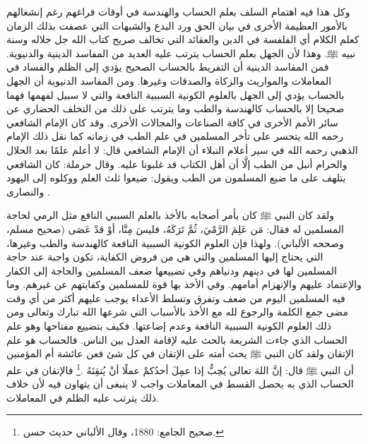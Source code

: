 وكل هذا فيه اهتمام السلف بعلم الحساب والهندسة في أوقات فراغهم رغم إنشغالهم بالأمور العظيمة الأخرى في بيان الحق ورد البدع والشبهات التي عصفت بذلك الزمان كعلم الكلام أي الفلفسة في الدين والعقائد التي تخالف صريح كتاب الله جل جلاله وسنة نبيه ﷺ. وهذا لأن الجهل بعلم الحساب يترتب عليه العديد من المفاسد الدينية والدنيوية. فمن المفاسد الدينية أن التفريط بالحساب الصحيح يؤدي إلى الظلم والفساد في المعاملات والمواريث والزكاة والصدقات وغيرها. ومن المفاسد الدنيوية أن الجهل بالحساب يؤدي إلى الجهل بالعلوم الكونية السببية النافعة والتي لا سبيل لفهمها فهما صحيحا إلا بالحساب كالهندسة والطب وما يترتب على ذلك من التخلف الحضاري عن سائر الأمم الأخرى في كافة الصناعات والمجالات الأخرى. وقد كان الإمام الشافعي رحمه الله يتحسر على تأخر المسلمين في علم الطب في زمانه كما نقل ذلك الإمام الذهبي رحمه الله في سير أعلام النبلاء أن الإمام الشافعي قال: لا أعلم علمًا بعد الحلال والحرام أنبل من الطب إلَّا أن أهل الكتاب قد غلبونا عليه. وقال حرملة: كان الشافعي يتلهف على ما ضيع المسلمون من الطب ويقول: ضيعوا ثلث العلم ووكلوه إلى اليهود والنصارى \href{https://shamela.ws/book/22669/4486#p7}{\faExternalLink} \cite{dahabi_Siyar}. 

ولقد كان النبي ﷺ كان يأمر أصحابه بالأخذ بالعلم السببي النافع مثل الرمي لحاجة المسلمين له فقال: مَن عَلِمَ الرَّمْيَ، ثُمَّ تَرَكَهُ، فليسَ مِنَّا، أوْ قدْ عَصَى {\footnotesize (صحيح مسلم، وصححه الألباني)}. ولهذا فإن العلوم الكونية السببية النافعة كالهندسة والطب وغيرها، التي يحتاج إليها المسلمين والتي هي من فروض الكفاية، تكون واجبة عند حاجة المسلمين لها في دينهم ودنياهم وفي تضييعها ضعف المسلمين والحاجة إلى الكفار والإعتماد عليهم والإنهزام أمامهم. وفي الأخذ بها قوة للمسلمين وكفايتهم عن غيرهم. وما فيه المسلمين اليوم من ضعف وتفرق وتسلط الأعداء يوجب عليهم أكثر من أي وقت مضى جمع الكلمة والرجوع لله مع الأخذ بالأسباب التي شرعها الله تبارك وتعالى ومن ذلك العلوم الكونية السببية النافعة وعدم إضاعتها. فكيف بتضييع مفتاحها وهو علم الحساب الذي جاءت الشريعة بالحث عليه لإقامة العدل بين الناس. فالحساب هو علم الإتقان ولقد كان النبي ﷺ يحث أمته على الإتقان في كل شئ فعن عائشة أم المؤمنين أن النبي ﷺ قال: إنَّ اللهَ تعالى يُحِبُّ إذا عمِلَ أحدُكمْ عملًا أنْ يُتقِنَهُ \href{https://shamela.ws/book/21659/2761#p1}{\faExternalLink} \cite{jamaaSagheer}.\footnote{صحيح الجامع: 1880، وقال الألباني حديث حسن.} فالإتقان في علم الحساب الذي به يحصل القسط في المعاملات واجب لا ينبغى أن يتهاون فيه لأن خلاف ذلك يترتب عليه الظلم في المعاملات.

